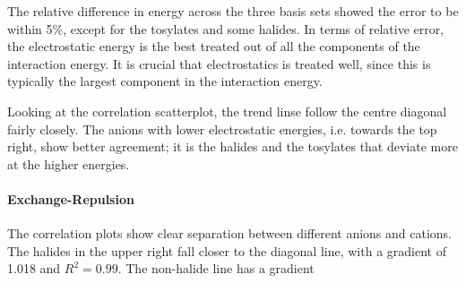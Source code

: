 \begin{multicols}{2}
The relative difference in energy across the three basis sets showed the error to be within 5\%, except for the tosylates and some halides.
In terms of relative error, the electrostatic energy is the best treated out of all the components of the interaction energy.
It is crucial that electrostatics is treated well, since this is typically the largest component in the interaction energy. 


Looking at the correlation scatterplot, the trend linse follow the centre diagonal fairly closely.
The anions with lower electrostatic energies, i.e. towards the top right, show better agreement; it is the halides and the tosylates that deviate more at the higher energies.

\paragraph{Exchange-Repulsion}
The correlation plots show clear separation between different anions and cations.
The halides in the upper right fall closer to the diagonal line, with a gradient of 1.018 and $R^2 = 0.99$.
The non-halide line has a gradient 


\end{multicols}
